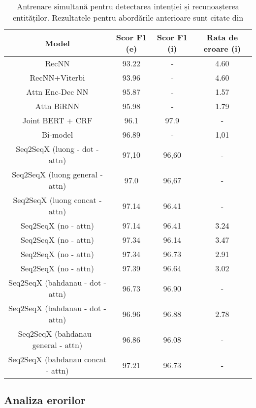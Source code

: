 \bigskip
\begin{table}[htp]
	\small
	\centering
	\begin{tabular}{ c c c c} 
		\hline
		\textbf{Model} 		 & \textbf{Scor F1 (e)} & \textbf{Scor F1 (i)} & \textbf{Rata de eroare (i)} \\
		\hline
		RecNN \cite{recursive-nn-intent} & 93.22 & - & 4.60 \\
		RecNN+Viterbi \cite{recursive-nn-intent} & 93.96 & - & 4.60 \\
		Attn Enc-Dec NN \cite{att_joint_bing} & 95.87 & - & 1.57 \\
		Attn BiRNN \cite{att_joint_bing} & 95.98 & - & 1.79 \\
		Joint BERT + CRF \cite{joint-bert} & 96.1 & 97.9 & - \\
		Bi-model \cite{bi-model} & 96.89 & - & 1,01 \\
		\hline
		Seq2SeqX (luong - dot - attn) & 97,10 & 96,60 & - \\ %
		Seq2SeqX (luong general - attn) & 97.0 & 96,67 & - \\ %
		Seq2SeqX (luong concat - attn) & 97.14 & 96.41 & - \\ %
		\hline
		Seq2SeqX (no - attn) & 97.14 & 96.41 & 3.24 \\ %
		Seq2SeqX (no - attn) & 97.34 & 96.14 & 3.47 \\ %
		Seq2SeqX (no - attn) & 97.34 & 96.73 & 2.91 \\ %
		Seq2SeqX (no - attn) & 97.39 & 96.64 & 3.02 \\ %
		\hline
		Seq2SeqX (bahdanau - dot - attn) & 96.73 & 96.90 & - \\ %
		Seq2SeqX (bahdanau - dot - attn) & 96.96 & 96.88 & 2.78 \\ %
		\hline
		Seq2SeqX (bahdanau - general - attn) & 96.86 & 96.08 & - \\ %
		\hline
		Seq2SeqX (bahdanau concat - attn) & 97.21 & 96.73 & - \\ %
		\hline
	\end{tabular}
	\caption{Antrenare simultană pentru detectarea intenției și recunoașterea entităților. Rezultatele pentru abordările anterioare sunt citate din \cite{att_joint_bing}}
	\label{rezultate3}
\end{table}

\subsection{Analiza erorilor}

